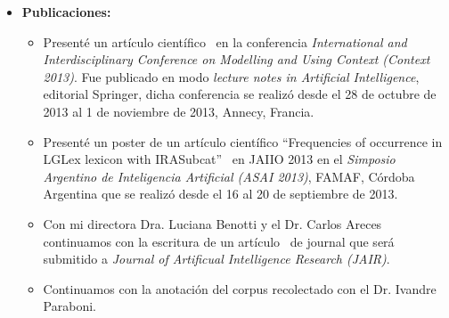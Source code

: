 \begin{itemize}
\item \textbf{Publicaciones:} 
\begin{itemize}
\item Present\'e un art\'iculo cient\'ifico~\cite{benotti-altamirano-context2013} en la conferencia \emph{International and Interdisciplinary Conference on Modelling and Using Context (Context 2013)}. Fue publicado en modo \emph{lecture notes in Artificial Intelligence}, editorial Springer, dicha conferencia se realiz\'o desde el 28 de octubre de 2013 al 1 de noviembre de 2013, Annecy, Francia.
\item Present\'e un poster de un art\'iculo cient\'ifico ``Frequencies of occurrence in LGLex lexicon with IRASubcat''~ \cite{tolone-altamirano} en JAIIO 2013 en el \emph{Simposio Argentino de Inteligencia Artificial (ASAI 2013)}, FAMAF, C\'ordoba Argentina que se realiz\'o desde el 16 al 20 de septiembre de 2013.
\item Con mi directora Dra. Luciana Benotti y el Dr. Carlos Areces continuamos con la escritura de un art\'iculo~\cite{benotti-altamirano-jair} de journal que ser\'a submitido a \emph{Journal of Artificual Intelligence Research (JAIR)}.
\item Continuamos con la anotaci\'on del corpus recolectado con el Dr. Ivandre Paraboni.
\end{itemize}


\end{itemize}
